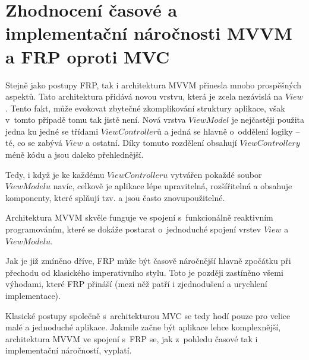 \documentclass[thesis=M,czech]{FITthesis}[2012/06/26]
\begin{document}
\section{Zhodnocení časové a implementační náročnosti MVVM a FRP oproti MVC}
Stejně jako postupy FRP, tak i architektura MVVM přinesla mnoho prospěšných aspektů. Tato architektura přidává novou vrstvu, která je zcela nezávislá na $View$. Tento fakt, může evokovat zbytečné zkomplikování struktury aplikace, však v~tomto případě tomu tak jistě není. Nová vrstva $ViewModel$ je nejčastěji použita jedna ku jedné se třídami $ViewControllerů$ a jedná se hlavně o~oddělení logiky -- té, co se zabývá $View$ a ostatní. Díky tomuto rozdělení obsahují $ViewControllery$ méně kódu a jsou daleko přehlednější.

Tedy, i když je ke každému $ViewControlleru$ vytvářen pokaždé soubor $ViewModelu$ navíc, celkově je aplikace lépe upravitelná, rozšířitelná a obsahuje komponenty, které splňují tzv.  a jsou často znovupoužitelné.

Architektura MVVM skvěle funguje ve spojení s~funkcionálně reaktivním programováním, které se dokáže postarat o~jednoduché spojení vrstev $View$ a $ViewModelu$.

Jak je již zmíněno dříve, FRP může být časově náročnější hlavně zpočátku při přechodu od klasického imperativního stylu. Toto je později zastíněno všemi výhodami, které FRP přináší (mezi něž patří i zjednodušení a urychlení implementace).

Klasické postupy společně s~architekturou MVC se tedy hodí pouze pro velice malé a jednoduché aplikace. Jakmile začne být aplikace lehce komplexnější, architektura MVVM ve spojení s~FRP se, jak z~pohledu časové tak i implementační náročností, vyplatí.

\begin{conclusion}

\end{conclusion}




\appendix
\end{document}
